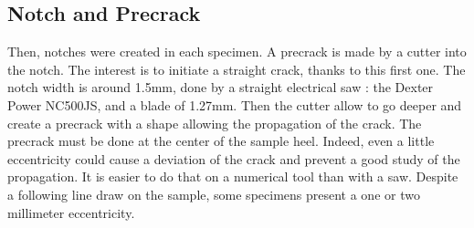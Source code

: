 
\subsection{Notch and Precrack}

Then, notches were created in each specimen. A precrack is made by a cutter into the notch. The interest is to initiate a straight crack, thanks to this first one. The notch width is around 1.5\si{\milli\meter}, done by a straight electrical saw : the Dexter Power NC500JS, and a blade of 1.27\si{\milli\meter}. Then the cutter allow to go deeper and create a precrack with a shape allowing the propagation of the crack. The precrack must be done at the center of the sample heel. Indeed, even a little eccentricity could cause a deviation of the crack and prevent a good study of the propagation. It is easier to do that on a numerical tool than with a saw. Despite a following line draw on the sample, some specimens present a one or two millimeter eccentricity. 

